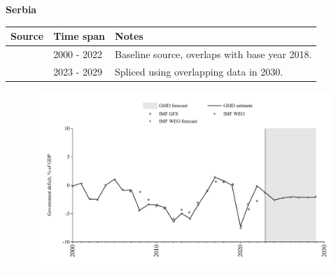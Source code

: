 \documentclass[12pt,a4paper,landscape]{article}
\begin{document}
\begin{adjustbox}{max totalsize={\paperwidth}{\paperheight},center}
\begin{minipage}[t][\textheight][t]{\textwidth}
\vspace*{0.5cm}
{}
\begin{center}
{\Large\bfseries Serbia}
\end{center}
\vspace{0.5cm}
\begin{table}[H]
\centering
\small
\begin{tabular}{|l|l|l|}
\hline
\textbf{Source} & \textbf{Time span} & \textbf{Notes} \\
\hline
\rowcolor{white}\cite{IMF_WEO}& 2000 - 2022 &Baseline source, overlaps with base year 2018.\\
\rowcolor{lightgray}\cite{IMF_WEO_forecast}& 2023 - 2029 &Spliced using overlapping data in 2030.\\
\hline
\end{tabular}
\end{table}
\begin{figure}[H]
\centering
\includegraphics[width=\textwidth,height=0.6\textheight,keepaspectratio]{graphs/SRB_govdef_GDP.pdf}
\end{figure}
\end{minipage}
\end{adjustbox}
\end{document}
